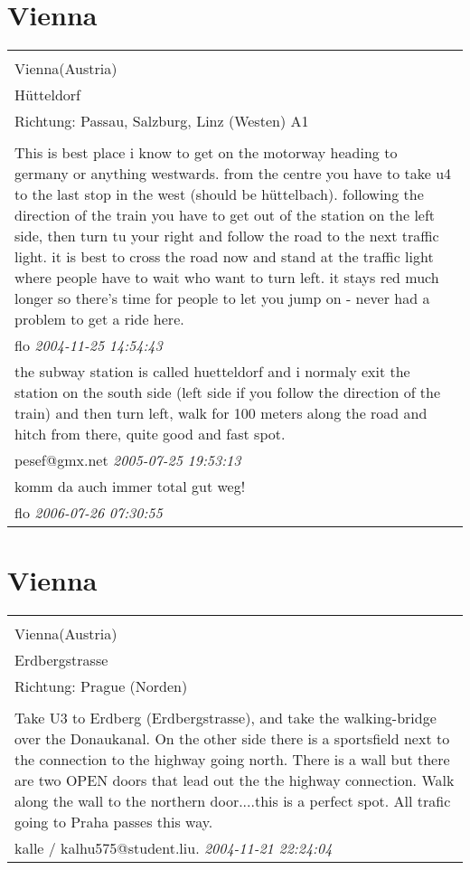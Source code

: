 \documentclass[a4paper,12pt]{article}
\begin{document}
\section{Vienna}
\begin{tabular}{|p{13cm}|}
\hline\\
Vienna(Austria)\\
Hütteldorf\\
Richtung: Passau, Salzburg, Linz (Westen) A1 \\
\hline\\
This is best place i know to get on the motorway heading to germany or anything westwards.
from the centre you have to take u4 to the last stop in the west (should be hüttelbach).
following the direction of the train you have to get out of the station on the left side, then turn tu your right and follow the road to the next traffic light.
it is best to cross the road now and stand at the traffic light where people have to wait who want to turn left. it stays red much longer so there's time for people to let you jump on - never had a problem to get a ride here. \\
flo \textit{ 2004-11-25 14:54:43 }\\\hline the subway station is called huetteldorf and i normaly exit the station on the south side (left side if you follow the direction of the train) and then turn left, walk for 100 meters along the road and hitch from there, quite good and fast spot. \\
pesef@gmx.net \textit{ 2005-07-25 19:53:13 }\\\hline komm da auch immer total gut weg! \\
flo \textit{ 2006-07-26 07:30:55 }\\\hline
\end{tabular}


\section{Vienna}
\begin{tabular}{|p{13cm}|}
\hline\\
Vienna(Austria)\\
Erdbergstrasse\\
Richtung: Prague (Norden) \\
\hline\\
Take U3 to Erdberg (Erdbergstrasse), and take the walking-bridge over the Donaukanal. On the other side there is a sportsfield next to the connection to the highway going north. There is a wall but there are two OPEN doors that lead out the the highway connection. Walk along the wall to the northern door....this is a perfect spot. All trafic going to Praha passes this way. \\
kalle / kalhu575@student.liu. \textit{ 2004-11-21 22:24:04 }\\\hline
\end{tabular}
\end{document}
